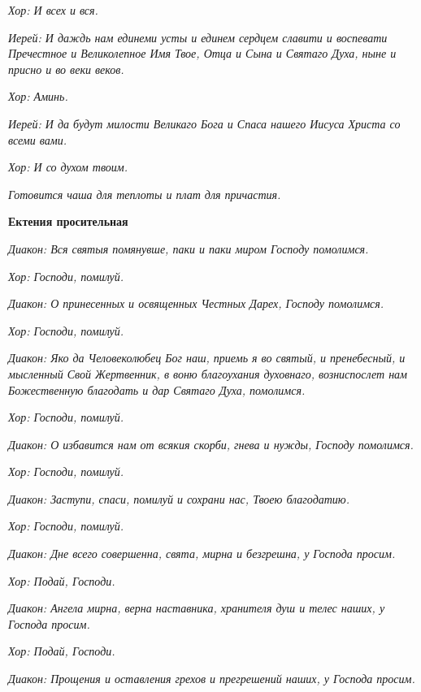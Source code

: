 \itshape Хор:\normalfont{} И всех и вся.


\itshape Иерей:\normalfont{} И даждь нам единеми усты и единем сердцем славити и воспевати Пречестное и Великолепное Имя Твое, Отца и Сына и Святаго Духа, ныне и присно и во веки веков.


\itshape Хор:\normalfont{} Аминь.


\itshape Иерей:\normalfont{} И да будут милости Великаго Бога и Спаса нашего Иисуса Христа со всеми вами.


\itshape Хор:\normalfont{} И со духом твоим.


\itshape Готовится чаша для теплоты и плат для причастия\normalfont{}.





\bfseries  Ектения просительная\normalfont{}


\itshape Диакон:\normalfont{} Вся святыя помянувше, паки и паки миром Господу помолимся.


\itshape Хор:\normalfont{} Господи, помилуй.


\itshape Диакон:\normalfont{} О принесенных и освященных Честных Дарех, Господу помолимся.


\itshape Хор:\normalfont{} Господи, помилуй.


\itshape Диакон:\normalfont{} Яко да Человеколюбец Бог наш, приемь я во святый, и пренебесный, и мысленный Свой Жертвенник, в воню благоухания духовнаго, возниспослет нам Божественную благодать и дар Святаго Духа, помолимся.


\itshape Хор:\normalfont{} Господи, помилуй.


\itshape Диакон:\normalfont{} О избавится нам от всякия скорби, гнева и нужды, Господу помолимся.


\itshape Хор:\normalfont{} Господи, помилуй.


\itshape Диакон:\normalfont{} Заступи, спаси, помилуй и сохрани нас, Твоею благодатию.


\itshape Хор:\normalfont{} Господи, помилуй.


\itshape Диакон:\normalfont{} Дне всего совершенна, свята, мирна и безгрешна, у Господа просим.


\itshape Хор:\normalfont{} Подай, Господи.


\itshape Диакон:\normalfont{} Ангела мирна, верна наставника, хранителя душ и телес наших, у Господа просим.


\itshape Хор:\normalfont{} Подай, Господи.


\itshape Диакон:\normalfont{} Прощения и оставления грехов и прегрешений наших, у Господа просим.



